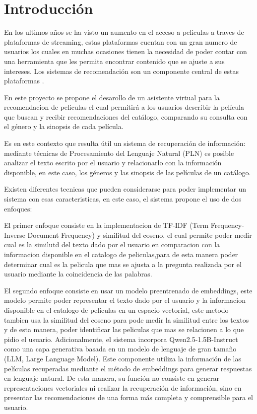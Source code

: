 ﻿\section{Introducción}

En los ultimos años se ha visto un aumento en el acceso a peliculas a traves de plataformas de streaming, estas plataformas cuentan con un gran numero de usuarios los cuales en muchas ocasiones tienen la necesidad de poder contar con una herramienta que les permita encontrar contenido que se ajuste a sus intereses. Los sistemas de recomendación son un componente central de estas plataformas \cite{gomezuribe2015netflix}.

En este proyecto se propone el desarollo de un asistente virtual para la recomendacion de peliculas el cual permitirá a los usuarios describir la película que buscan y recibir recomendaciones del catálogo, comparando su consulta con el género y la sinopsis de cada película.

Es en este contexto que resulta útil un sistema de recuperación de información: mediante técnicas de Procesamiento del Lenguaje Natural (PLN) es posible analizar el texto escrito por el usuario y relacionarlo con la información disponible, en este caso, los géneros y las sinopsis de las películas de un catálogo.

Existen diferentes tecnicas que pueden considerarse para poder implementar un sistema con esas caracteristicas, en este caso, el sistema propone el uso de dos enfoques:

El primer enfoque consiste en la implementacion de TF-IDF (Term Frequency-Inverse Document Frequency) y similitud del coseno, el cual permite poder medir cual es la similutd del texto dado por el usuario en comparacion con la informacion disponible en el catalogo de peliculas,para de esta manera poder determinar cual es la pelicula que mas se ajusta a la pregunta realizada por el usuario mediante la coincidencia de las palabras.

El segundo enfoque consiste en usar un modelo preentrenado de embeddings, este modelo permite poder representar el texto dado por el usuario y la informacion disponible en el catalogo de peliculas en un espacio vectorial, este metodo tambien usa la similitud del coseno para pode medir la similitud entre los textos y de esta manera, poder identificar las peliculas que mas se relacionen a lo que pidio el usuario. Adicionalmente, el sistema incorpora Qwen2.5-1.5B-Instruct como una capa generativa basada en un modelo de lenguaje de gran tamaño (LLM, Large Language Model). Este componente utiliza la información de las películas recuperadas mediante el método de embeddings para generar respuestas en lenguaje natural. De esta manera, su función no consiste en generar representaciones vectoriales ni realizar la recuperación de información, sino en presentar las recomendaciones de una forma más completa y comprensible para el usuario.

